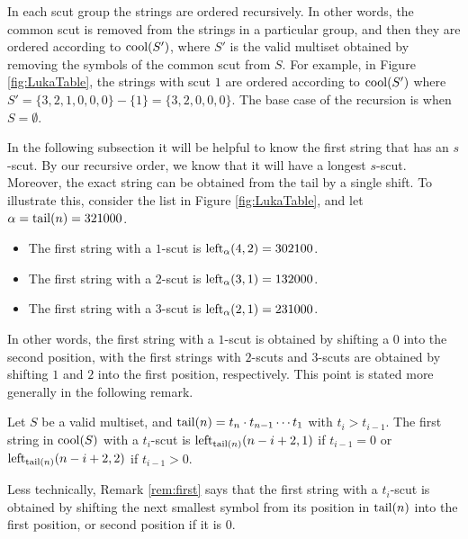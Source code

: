 In each scut group the strings are ordered recursively.
In other words, the common scut is removed from the strings in a particular group, and then they are ordered according to $\cool{S'}$, where $S'$ is the valid multiset obtained by removing the symbols of the common scut from $S$.
For example, in Figure \ref{fig:LukaTable}, the strings with scut $1$ are ordered according to $\cool{S'}$ where $S' = \{3,2,1,0,0,0\} - \{1\} = \{3,2,0,0,0\}$.
The base case of the recursion is when $S = \emptyset$.

In the following subsection it will be helpful to know the first string that has an $s$-scut.
By our recursive order, we know that it will have a longest $s$-scut.
Moreover, the exact string can be obtained from the tail by a single shift.
To illustrate this, consider the list in Figure \ref{fig:LukaTable}, and let $\alpha = \tail(n) = 321000$.
\begin{itemize}
    \item The first string with a $1$-scut is $\leftshift[\alpha]{4}{2} = 302100$.
    \item The first string with a $2$-scut is $\leftshift[\alpha]{3}{1} = 132000$.
    \item The first string with a $3$-scut is $\leftshift[\alpha]{2}{1} = 231000$.
\end{itemize}
In other words, the first string with a $1$-scut is obtained by shifting a $0$ into the second position, with the first strings with $2$-scuts and $3$-scuts are obtained by shifting $1$ and $2$ into the first position, respectively.
This point is stated more generally in the following remark.

\begin{remark}
\label{rem:first}
Let $S$ be a valid multiset, and $\tail(n) = t_n \cdot t_{n-1} \cdots t_1$ with $t_i > t_{i-1}$.
The first string in $\cool{S}$ with a $t_i$-scut is $\leftshift[\tail(n)]{n-i+2}{1}$ if $t_{i-1} = 0$ or $\leftshift[\tail(n)]{n-i+2}{2}$ if $t_{i-1} > 0$.
\end{remark}

Less technically, Remark \ref{rem:first} says that the first string with a $t_i$-scut is obtained by shifting the next smallest symbol from its position in $\tail(n)$ into the first position, or second position if it is $0$.

